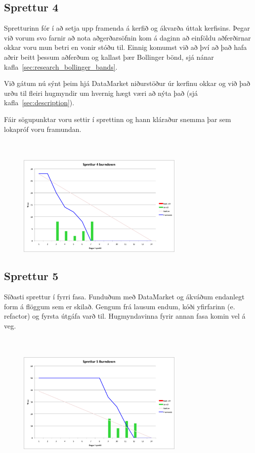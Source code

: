 \documentclass{article}
\begin{document}
\subsection{Sprettur 4}
Spretturinn fór í að setja upp framenda á kerfið og ákvarða úttak kerfisins. 
Þegar við vorum svo farnir að nota aðgerðarsöfnin 
kom á daginn að einföldu aðferðirnar okkar voru mun betri en vonir stóðu til.
Einnig komumst við að því að það hafa aðrir beitt þessum aðferðum 
og kallast þær Bollinger bönd, sjá nánar kafla~\ref{sec:research_bollinger_bands}. 

Við gátum nú sýnt þeim hjá DataMarket niðurstöður úr kerfinu okkar og við það
urðu til fleiri hugmyndir um hvernig hægt væri að nýta það (sjá kafla~\ref{sec:description}).

Fáir sögupunktar voru settir í sprettinn og hann kláraður snemma þar sem lokapróf voru framundan.
\hfil \\
\hfil \\
\hfil \\
\begin{figure}[H]
 \centering
 \includegraphics[width=0.72\textwidth]{Sprettur4_Burndown.png}
 \caption{}
\label{fig:sp4}
\end{figure}
\newpage
\subsection{Sprettur 5}
Síðasti sprettur í fyrri fasa. Funduðum með DataMarket og ákváðum endanlegt form á
flöggum sem er skilað. Gengum frá lausum endum, kóði yfirfarinn 
(e. refactor) og fyrsta útgáfa varð til. Hugmyndavinna fyrir annan fasa komin vel á veg.
\hfil \\
\hfil \\
\hfil \\
\begin{figure}[H]
 \centering
 \includegraphics[width=0.72\textwidth]{Sprettur5_Burndown.png}
 \caption{}
\label{fig:sp5}
\end{figure}
\newpage
\end{document}
